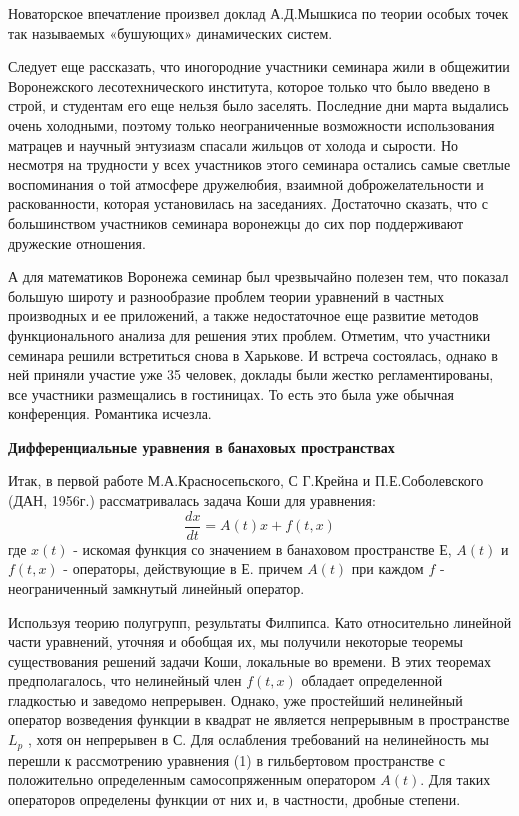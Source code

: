 Новаторское впечатление произвел доклад А.Д.Мышкиса по теории особых точек так называемых «бушующих» динамических систем.

 	Следует еще рассказать, что иногородние участники семинара жили в общежитии Воронежского лесотехнического института, которое только что было введено в строй, и студентам его еще нельзя было заселять. Последние дни марта выдались очень холодными, поэтому только неограниченные возможности использования матрацев и научный энтузиазм спасали жильцов от холода и сырости. Но несмотря на трудности у всех участников этого семинара остались самые светлые воспоминания о той атмосфере дружелюбия, взаимной доброжелательности и раскованности, которая установилась на заседаниях. Достаточно сказать, что с большинством участников семинара воронежцы до сих пор поддерживают дружеские отношения.
 
А для математиков Воронежа семинар был чрезвычайно полезен тем, что показал большую широту и разнообразие проблем теории уравнений в       частных производных и ее приложений, а также недостаточное еще развитие методов функционального анализа для решения этих проблем.
Отметим, что участники семинара решили встретиться снова в Харькове. И встреча состоялась, однако в ней приняли участие уже 35 человек, доклады были жестко регламентированы, все участники размещались в гостиницах. То есть это была уже обычная конференция. Романтика исчезла.

{\bf Дифференциальные уравнения в банаховых пространствах}

Итак, в первой работе М.А.Красносепьского, С Г.Крейна и П.Е.Соболевского (ДАН, 1956г.) рассматривалась задача Коши для уравнения:
$$\frac{dx}{dt} = A(t)x + f(t, x)$$
где $x(t)$ - искомая функция со значением в банаховом пространстве $Е$, $A(t)$ и $f(t,x)$ - операторы, действующие в $Е$. причем $A(t)$ при каждом $f$ - неограниченный замкнутый линейный оператор.

Используя теорию полугрупп, результаты Филпипса. Като относительно линейной части уравнений, уточняя и обобщая их, мы получили некоторые теоремы существования решений задачи Коши, локальные во времени. В этих теоремах предполагалось, что нелинейный член $f(t,x)$ обладает определенной гладкостью и заведомо непрерывен. Однако, уже простейший нелинейный оператор возведения функции в квадрат не является непрерывным в пространстве $L_p$ , хотя он непрерывен в С. Для ослабления требований на нелинейность мы перешли к рассмотрению уравнения (1) в гильбертовом пространстве с положительно определенным самосопряженным оператором $A(t)$. Для таких операторов определены функции от них и, в частности, дробные степени. 

